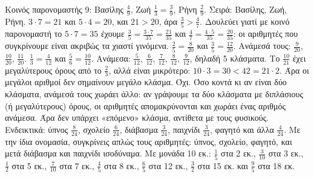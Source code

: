  Κοινός παρονομαστής 9: Βασίλης $\frac{4}{9}$, Ζωή $\frac{1}{3}=\frac{3}{9}$, Ρήνη $\frac{2}{9}$. Σειρά: Βασίλης, Ζωή, Ρήνη.
 $3\cdot 7=21$ και $5\cdot 4=20$, και $21>20$, άρα $\frac{3}{5}>\frac{4}{7}$. Δουλεύει γιατί με κοινό παρονομαστή το $5\cdot 7=35$ έχουμε $\frac{3}{5}=\frac{3\cdot 7}{35}=\frac{21}{35}$ και $\frac{4}{7}=\frac{4\cdot 5}{35}=\frac{20}{35}$: οι αριθμητές που συγκρίνουμε είναι ακριβώς τα χιαστί γινόμενα.
 $\frac{2}{5}=\frac{8}{20}$ και $\frac{3}{5}=\frac{12}{20}$. Ανάμεσά τους: $\frac{9}{20}$, $\frac{10}{20}$, $\frac{11}{20}$.
 $\frac{1}{3}=\frac{4}{12}$ και $\frac{5}{6}=\frac{10}{12}$. Ανάμεσα: $\frac{5}{12}$, $\frac{6}{12}$, $\frac{7}{12}$, $\frac{8}{12}$, $\frac{9}{12}$, δηλαδή 5 κλάσματα.
 Το $\frac{10}{21}$ έχει μεγαλύτερους όρους από το $\frac{2}{3}$, αλλά είναι μικρότερο: $10\cdot 3=30<42=21\cdot 2$. Άρα οι μεγάλοι αριθμοί δεν σημαίνουν μεγάλο κλάσμα.
 Όχι. Όσο κοντά κι αν είναι δύο κλάσματα, ανάμεσά τους χωράει άλλο: αν γράψουμε τα δύο κλάσματα με διπλάσιους (ή μεγαλύτερους) όρους, οι αριθμητές απομακρύνονται και χωράει ένας αριθμός ανάμεσα. Άρα δεν υπάρχει «επόμενο» κλάσμα, αντίθετα με τους φυσικούς.
 Ενδεικτικά: ύπνος $\frac{8}{24}$, σχολείο $\frac{6}{24}$, διάβασμα $\frac{3}{24}$, παιχνίδι $\frac{3}{24}$, φαγητό και άλλα $\frac{4}{24}$. Με την ίδια ονομασία, συγκρίνεις απλώς τους αριθμητές: ύπνος, σχολείο, φαγητό, και μετά διάβασμα και παιχνίδι ισοδύναμα.
 Με μονάδα 10 εκ.: $\frac{1}{5}$ στα 2 εκ., $\frac{3}{10}$ στα 3 εκ., $\frac{1}{2}$ στα 5 εκ., $\frac{7}{10}$ στα 7 εκ., $\frac{4}{5}$ στα 8 εκ., $\frac{6}{5}$ στα 12 εκ., $\frac{3}{2}$ στα 15 εκ. και $\frac{9}{5}$ στα 18 εκ.
